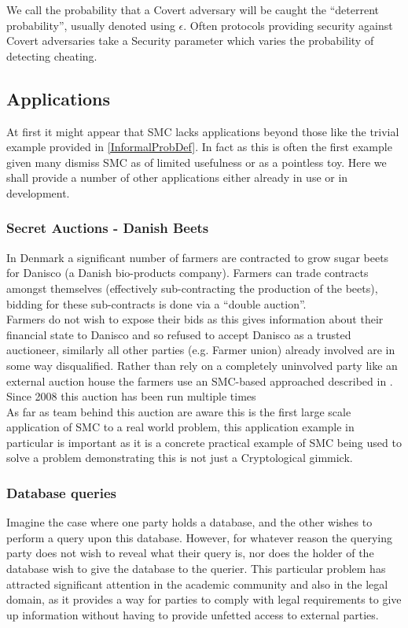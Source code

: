 \documentclass[a4paper,10pt]{article}
\begin{document}
				We call the probability that a Covert adversary will be caught the ``deterrent probability'', usually denoted using $\epsilon$. Often protocols providing security against Covert adversaries take a Security parameter which varies the probability of detecting cheating.


		\subsection{Applications} \label{Applications}
			At first it might appear that SMC lacks applications beyond those like the trivial example provided in \ref{InformalProbDef}. In fact as this is often the first example given many dismiss SMC as of limited usefulness or as a pointless toy. Here we shall provide a number of other applications either already in use or in development.


			\subsubsection{Secret Auctions - Danish Beets} \label{BeetsAuctionApplication}
				In Denmark a significant number of farmers are contracted to grow sugar beets for Danisco (a Danish bio-products company). Farmers can trade contracts amongst themselves (effectively sub-contracting the production of the beets), bidding for these sub-contracts is done via a ``double auction''.\\

				Farmers do not wish to expose their bids as this gives information about their financial state to Danisco and so refused to accept Danisco as a trusted auctioneer, similarly all other parties (e.g. Farmer union) already involved are in some way disqualified. Rather than rely on a completely uninvolved party like an external auction house the farmers use an SMC-based approached described in \cite{SugarBeets}. Since 2008 this auction has been run multiple times \\

				As far as team behind this auction are aware this is the first large scale application of SMC to a real world problem, this application example in particular is important as it is a concrete practical example of SMC being used to solve a problem demonstrating this is not just a Cryptological gimmick.

			\subsubsection{Database queries} \label{LegalDatabaseApplication}
				Imagine the case where one party holds a database, and the other wishes to perform a query upon this database. However, for whatever reason the querying party does not wish to reveal what their query is, nor does the holder of the database wish to give the database to the querier. This particular problem has attracted significant attention in the academic community and also in the legal domain, as it provides a way for parties to comply with legal requirements to give up information without having to provide unfetted access to external parties.
\end{document}
